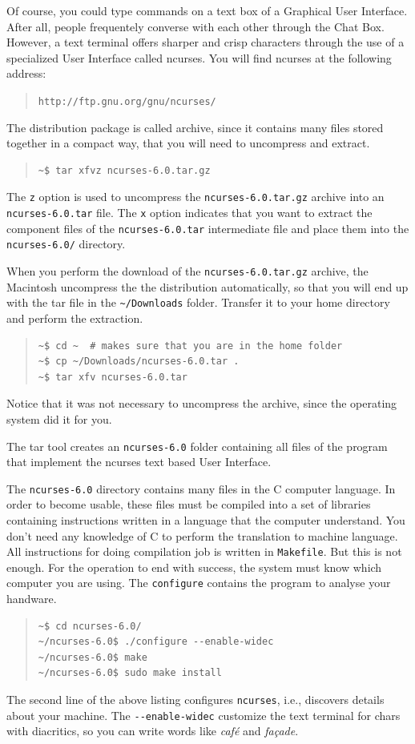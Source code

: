 \documentclass[a4paper,12pt]{book}
\begin{document}
Of course, you could type commands
on a text box of a Graphical User
Interface. After all, people frequentely
converse with each other through
the Chat Box. However, a text terminal
offers sharper and crisp characters
through the use of a specialized
User Interface called ncurses.
You will find ncurses at
the following address:
\begin{quote}
\verb|http://ftp.gnu.org/gnu/ncurses/|
\end{quote}
The distribution package is called
archive, since it contains many
files stored together in a compact way,
that you will need to uncompress
and extract.
\begin{quote}
\begin{verbatim}
~$ tar xfvz ncurses-6.0.tar.gz
\end{verbatim}
\end{quote}
The \verb|z| option is used to
uncompress the
\verb|ncurses-6.0.tar.gz| archive into
an \verb|ncurses-6.0.tar| file. The
\verb|x| option indicates that
you want to extract the component
files of the \verb|ncurses-6.0.tar| intermediate
file and place them into the \verb|ncurses-6.0/|
directory.

When you perform the download of the
\verb|ncurses-6.0.tar.gz| archive, the
Macintosh uncompress the the distribution
automatically, so that you will end up
with the tar file in the \verb|~/Downloads|
folder. Transfer it to your home directory
and perform the extraction.
\begin{quote}
\begin{verbatim}
~$ cd ~  # makes sure that you are in the home folder
~$ cp ~/Downloads/ncurses-6.0.tar .
~$ tar xfv ncurses-6.0.tar
\end{verbatim}
\end{quote}
Notice that it was not necessary to uncompress
the archive, since the operating system
did it for you.

The tar tool creates an \verb|ncurses-6.0| folder
containing all files of the program that implement
the ncurses text based User Interface.

The \verb|ncurses-6.0| directory contains
many files in the C  computer language.
In order to become usable, these files
must be compiled into a set of libraries
containing instructions written in a
language that the computer understand.
You don't need any knowledge of C to
perform the translation to machine
language. All instructions for
doing compilation job is written
in  \verb|Makefile|. But this is not
enough. For the operation to end with
success, the system must know which
computer you are using. The \verb|configure|
contains the program to analyse your
handware.
\begin{quote}
\begin{verbatim}
~$ cd ncurses-6.0/
~/ncurses-6.0$ ./configure --enable-widec
~/ncurses-6.0$ make
~/ncurses-6.0$ sudo make install
\end{verbatim}
\end{quote}
The second line of the above listing
configures \verb|ncurses|, i.e.,
discovers details about your machine.
The \verb|--enable-widec| customize
the text terminal for chars with
diacritics, so you can write words
like {\em café} and {\em façade}.
\end{document}

